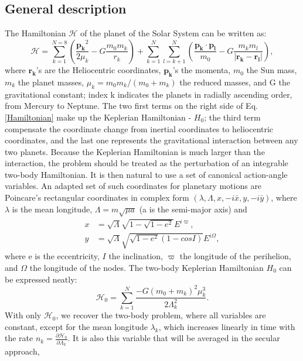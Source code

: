 \documentclass[12pt]{article}
\begin{document}
	\subsection{General description}
	The Hamiltonian $\mathcal{H}$ of the planet of the Solar System can be written as:
	\begin{equation} \label{Hamiltonian}
	\mathcal{H} = \sum_{k=1}^{N=8} \left(  \frac{\boldsymbol{p_k}^2 }{2\mu_k} - G \frac{m_0 m_k}{r_k}\right) + \sum_{k=1}^{N} \sum_{l=k+1}^{N} \left(\frac{\boldsymbol{p_k} \cdot \boldsymbol{p_l}}{m_0} - G \frac{m_k m_l}{| \boldsymbol{r_k} -  \boldsymbol{r_l}|} \right),
	\end{equation}
	where $ \boldsymbol{r_k}$'s are the Heliocentric coordinates, $ \boldsymbol{p_k}$'s the momenta, $m_0$ the Sun mass, $m_k$ the planet masses, $\mu_k = m_0 m_k / (m_0 + m_k)$ the reduced masses, and G the gravitational constant; index k indicates the planets in radially ascending order, from Mercury to Neptune. The two first terms on the right side of Eq. \ref{Hamiltonian} make up the Keplerian Hamiltonian - $H_0$;  the third term compensate the coordinate change from inertial coordinates to heliocentric coordinates, and the last one represents the gravitational interaction between any two planets. Because the Keplerian Hamiltonian is much larger than the interaction, the problem should be treated as the perturbation of an integrable two-body Hamiltonian. It is then natural to use a set of canonical action-angle variables. An adapted set of such coordinates for planetary motions are Poincare's rectangular coordinates in complex form $(\lambda, \Lambda, x, -i \bar{x}, y, -i \bar{y} )$, where $\lambda$ is the mean longitude, $\Lambda = m\sqrt{\mu a}$ (a is the semi-major axis) and
	\begin{align}
	x &= \sqrt{\Lambda} \sqrt{1 - \sqrt{1-e^2}} E^{i \varpi}, \\
	y &= \sqrt{\Lambda} \sqrt{\sqrt{1-e^2}(1-cos I  )} E^{i\Omega},
	\end{align}
	where e is the eccentricity, $I$  the inclination, $\varpi$ the longitude of the perihelion, and $\Omega$ the longitude of the nodes. The two-body Keplerian Hamiltonian $H_0$ can be expressed neatly:
	\begin{equation}
	\mathcal{H}_0 = \sum_{k=1}^{N} \frac{-G(m_0 + m_k)^2\mu_k^3}{2\Lambda_k^2} .
	\end{equation}
	With only $\mathcal{H}_0$, we recover the two-body problem, where all variables are constant, except for the mean longitude $\lambda_k$, which increases linearly in time with the rate $n_k = \frac{\partial \mathcal{H}_0}{\partial \Lambda_k} $. It is also this variable that will be averaged in the secular approach,
\end{document}
